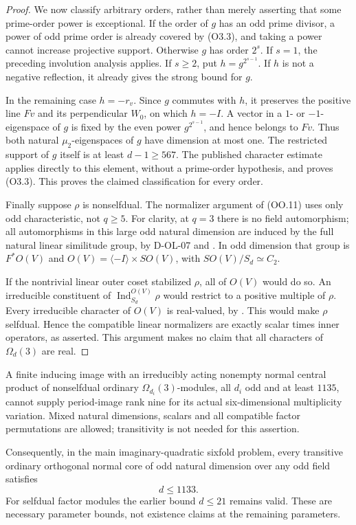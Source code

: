 \begin{proof}
We now classify arbitrary orders, rather than merely asserting
that some prime-order power is exceptional.  If the order of
$g$ has an odd prime divisor, a power of odd prime order is
already covered by (O3.3), and taking a power cannot increase
projective support.  Otherwise $g$ has order $2^s$.  If $s=1$,
the preceding involution analysis applies.  If $s\ge2$, put
$h=g^{2^{s-1}}$.  If $h$ is not a negative reflection, it
already gives the strong bound for $g$.

In the remaining case $h=-r_v$.  Since $g$ commutes with $h$,
it preserves the positive line $Fv$ and its perpendicular
$W_0$, on which $h=-I$.  A vector in a $1$- or $-1$-eigenspace
of $g$ is fixed by the even power $g^{2^{s-1}}$, and hence
belongs to $Fv$.  Thus both natural $\mu_2$-eigenspaces of
$g$ have dimension at most one.  The restricted support of
$g$ itself is at least $d-1\ge567$.  The published character
estimate applies directly to this element, without a
prime-order hypothesis, and proves (O3.3).  This proves the
claimed classification for every order.

Finally suppose $\rho$ is nonselfdual.  The normalizer argument
of (OO.11) uses only odd characteristic, not $q\ge5$.
For clarity, at $q=3$ there is no field automorphism; all
automorphisms in this large odd natural dimension are induced
by the full natural linear similitude group, by D-OL-07 and
\cite[Section~2.2.2, Table~2.1, p.~14]{HES:LiXia2022}.
In odd dimension that group is $F^*O(V)$ and
$O(V)=\langle-I\rangle\times SO(V)$, with
$SO(V)/S_d\simeq C_2$.

If the nontrivial linear outer coset stabilized $\rho$, all
of $O(V)$ would do so.  An irreducible constituent of
$\operatorname{Ind}_{S_d}^{O(V)}\rho$ would restrict to a
positive multiple of $\rho$.  Every irreducible character of
$O(V)$ is real-valued, by
\cite[Theorem~1, p.~44; exact domain and attribution,
pp.~39--40]{OL:KTV2023}.  This would make $\rho$ selfdual.
Hence the compatible linear normalizers are exactly scalar
times inner operators, as asserted.  This argument makes no
claim that all characters of $\Omega_d(3)$ are real.
\end{proof}

\begin{theorem}
\label{D-OL-15}
A finite inducing image with an irreducibly acting nonempty normal central
product of nonselfdual ordinary $\Omega_{d_i}(3)$-modules,
all $d_i$ odd and at least $1135$, cannot supply period-image
rank nine for its actual six-dimensional multiplicity variation.
Mixed natural dimensions, scalars and all compatible factor
permutations are allowed; transitivity is not needed for this
assertion.

Consequently, in the main imaginary-quadratic sixfold problem,
every transitive ordinary orthogonal normal core of odd natural
dimension over any odd field satisfies
\[
                              d\le1133.                    \tag{O3.8}
\]
For selfdual factor modules the earlier bound $d\le21$ remains
valid.  These are necessary parameter bounds, not existence
claims at the remaining parameters.
\end{theorem}

